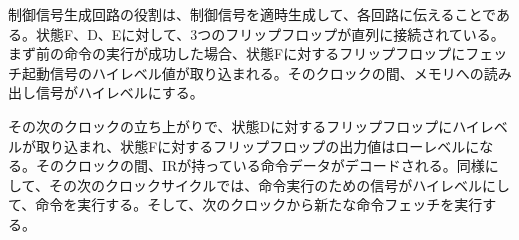 \documentclass[submit]{ipsj}
\begin{document}
制御信号生成回路の役割は、制御信号を適時生成して、各回路に伝えることである。状態F、D、Eに対して、3つのフリップフロップが直列に接続されている。まず前の命令の実行が成功した場合、状態Fに対するフリップフロップにフェッチ起動信号のハイレベル値が取り込まれる。そのクロックの間、メモリへの読み出し信号がハイレベルにする。

その次のクロックの立ち上がりで、状態Dに対するフリップフロップにハイレベルが取り込まれ、状態Fに対するフリップフロップの出力値はローレベルになる。そのクロックの間、IRが持っている命令データがデコードされる。同様にして、その次のクロックサイクルでは、命令実行のための信号がハイレベルにして、命令を実行する。そして、次のクロックから新たな命令フェッチを実行する。








\end{document}
